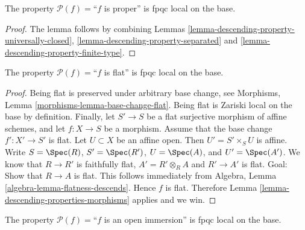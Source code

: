 \begin{lemma}
\label{lemma-descending-property-proper}
The property $\mathcal{P}(f) =$``$f$ is proper''
is fpqc local on the base.
\end{lemma}

\begin{proof}
The lemma follows by combining
Lemmas \ref{lemma-descending-property-universally-closed},
\ref{lemma-descending-property-separated}
and \ref{lemma-descending-property-finite-type}.
\end{proof}

\begin{lemma}
\label{lemma-descending-property-flat}
The property $\mathcal{P}(f) =$``$f$ is flat''
is fpqc local on the base.
\end{lemma}

\begin{proof}
Being flat is preserved under arbitrary base change, see
Morphisms, Lemma \ref{morphisms-lemma-base-change-flat}.
Being flat is Zariski local on the base by definition.
Finally, let
$S' \to S$ be a flat surjective morphism of affine schemes,
and let $f : X \to S$ be a morphism. Assume that the base change
$f' : X' \to S'$ is flat.
Let $U \subset X$ be an affine open. Then $U' = S' \times_S U$
is affine. Write
$S = \Spec(R)$,
$S' = \Spec(R')$,
$U = \Spec(A)$, and
$U' = \Spec(A')$.
We know that $R \to R'$ is faithfully flat,
$A' = R' \otimes_R A$ and $R' \to A'$ is flat.
Goal: Show that $R \to A$ is flat.
This follows immediately from
Algebra, Lemma \ref{algebra-lemma-flatness-descends}.
Hence $f$ is flat.
Therefore Lemma \ref{lemma-descending-properties-morphisms} applies and we win.
\end{proof}

\begin{lemma}
\label{lemma-descending-property-open-immersion}
The property $\mathcal{P}(f) =$``$f$ is an open immersion''
is fpqc local on the base.
\end{lemma}

